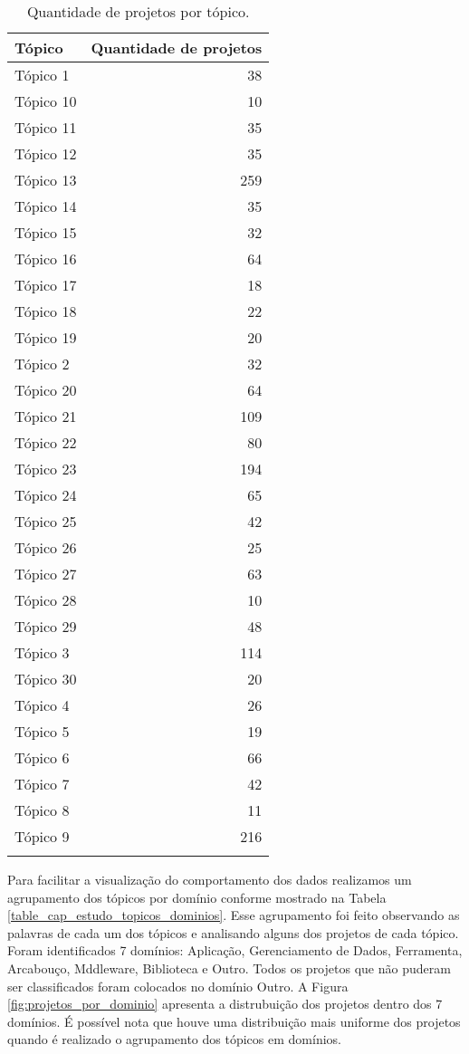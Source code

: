 \begingroup
\begin{longtable}{|l|r|}

\hline
Tópico & Quantidade de projetos\\
\hline
Tópico 1 & 38\\
\hline
Tópico 10 & 10\\
\hline
Tópico 11 & 35\\
\hline
Tópico 12 & 35\\
\hline
Tópico 13 & 259\\
\hline
Tópico 14 & 35\\
\hline
Tópico 15 & 32\\
\hline
Tópico 16 & 64\\
\hline
Tópico 17 & 18\\
\hline
Tópico 18 & 22\\
\hline
Tópico 19 & 20\\
\hline
Tópico 2 & 32\\
\hline
Tópico 20 & 64\\
\hline
Tópico 21 & 109\\
\hline
Tópico 22 & 80\\
\hline
Tópico 23 & 194\\
\hline
Tópico 24 & 65\\
\hline
Tópico 25 & 42\\
\hline
Tópico 26 & 25\\
\hline
Tópico 27 & 63\\
\hline
Tópico 28 & 10\\
\hline
Tópico 29 & 48\\
\hline
Tópico 3 & 114\\
\hline
Tópico 30 & 20\\
\hline
Tópico 4 & 26\\
\hline
Tópico 5 & 19\\
\hline
Tópico 6 & 66\\
\hline
Tópico 7 & 42\\
\hline
Tópico 8 & 11\\
\hline
Tópico 9 & 216\\
\hline
\caption{Quantidade de projetos por tópico.}
\end{longtable}
\label{table:tabela_quantidade_projetos_topicos}
\endgroup





Para facilitar a visualização do comportamento dos dados  realizamos um agrupamento dos tópicos por domínio conforme mostrado na Tabela \ref{table_cap_estudo_topicos_dominios}. Esse agrupamento foi feito observando as palavras de cada um dos tópicos e analisando alguns dos projetos de cada tópico. Foram identificados 7 domínios: Aplicação, Gerenciamento de Dados, Ferramenta, Arcabouço, Mddleware, Biblioteca e Outro. Todos os projetos que não puderam ser classificados foram colocados no domínio Outro. A Figura \ref{fig:projetos_por_dominio} apresenta a distrubuição dos projetos dentro dos 7 domínios. É possível nota que houve uma distribuição mais uniforme dos projetos quando é realizado o agrupamento dos tópicos em domínios. 



